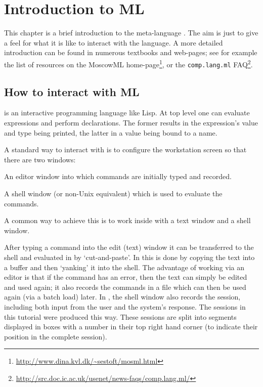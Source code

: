 \chapter{Introduction to ML}
\label{ML}

This chapter is a brief introduction to the meta-language \ML.  The
aim is just to give a feel for what it is like to interact with the
language.  A more detailed introduction can be found in numerous
textbooks and web-pages; see for example the list of resources on the
MoscowML
home-page\footnote{\url{http://www.dina.kvl.dk/~sestoft/mosml.html}},
or the \texttt{comp.lang.ml}
FAQ\footnote{\url{http://src.doc.ic.ac.uk/usenet/news-faqs/comp.lang.ml/}}.

\section{How to interact with ML}

\ML{} is an interactive programming language like Lisp. At top level
one can evaluate expressions and perform declarations. The former
results in the expression's value and type being printed, the latter
in a value being bound to a name.

A standard way to interact with \ML{} is to configure the workstation
screen so that there are two windows:
\begin{myenumerate}
\item An editor window into which \ML{} commands are initially typed
  and recorded.
\item A shell window (or non-Unix equivalent) which is used to
  evaluate the commands.
\end{myenumerate}

\noindent
A common way to achieve this is to work inside  with a text
window and a shell window.

After typing a command into the edit (text) window it can be
transferred to the shell and evaluated in \HOL{} by `cut-and-paste'. In
 this is done by copying the text into a buffer and then
`yanking' it into the shell. The advantage of working via an editor is
that if the command has an error, then the text can simply be edited
and used again; it also records the commands in a file which can then
be used again (via a batch load) later. In , the shell
window also records the session, including both input from the user
and the system's response. The sessions in this tutorial were produced
this way. These sessions are split into segments displayed in boxes
with a number in their top right hand corner (to indicate their
position in the complete session).

